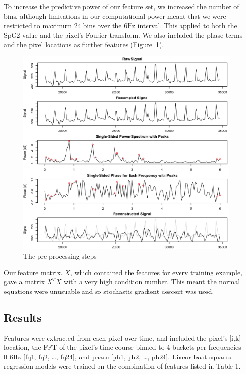 \documentclass[12pt]{article}
\begin{document}
  To increase the predictive power of our feature set, we increased the number of bins, although limitations in our computational power meant that we were restricted to maximum 24 bins over the 6Hz interval. This applied to both the SpO2 value and the pixel's Fourier transform. We also included the phase terms and the pixel locations as further features (Figure~\ref{figure:preprocessing}).

  \begin{figure}[tb]
    \captionsetup{justification=centering}
    \includegraphics[width=\textwidth]{images/fig1.png}
    \caption{The pre-processing steps \label{figure:preprocessing}}
  \end{figure}
  
 Our feature matrix, \(X\), which contained the features for every training example, gave a matrix $X^TX$ with a very high condition number. This meant the normal equations were unusuable and so stochastic gradient descent was used.
 
 \subsection*{Results}
 Features were extracted from each pixel over time, and included the pixel’s [i,k] location, the FFT of the pixel’s time course binned to 4 buckets per frequencies 0-6Hz [fq1, fq2, …, fq24], and phase [ph1, ph2, …, ph24]. Linear least squares regression models were trained on the combination of features listed in Table 1.\\
\end{document}
